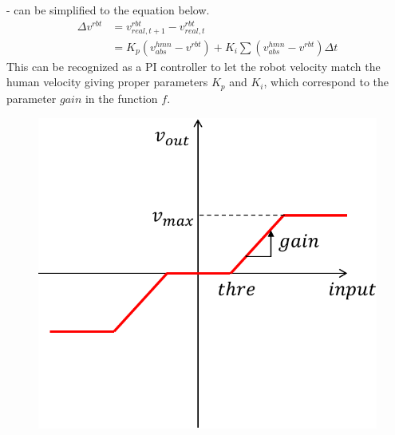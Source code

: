 - can be simplified to the equation below.
\begin{align}
\Delta v^{rbt} &= v^{rbt}_{real, t+1} - v^{rbt}_{real, t}\\
&= K_p(v^{hmn}_{abs} - v^{rbt}) + K_i\sum (v^{hmn}_{abs} - v^{rbt}) \Delta t
\end{align}
This can be recognized as a PI controller to let the robot velocity match the human velocity giving proper parameters \(K_p\) and \(K_i\), which correspond to the parameter \(gain\) in the function \(f\).

\begin{figure}[htbp]
  \begin{center}
    \begin{minipage}{0.45\hsize}
      \begin{center}
      \includegraphics[width=1.00\columnwidth]{figs/filter_vel_1}
      \end{center}
    \end{minipage}
    \begin{minipage}{0.45\hsize}
      \begin{center}

\end{center}
\end{minipage}
\end{center}
\end{figure}
